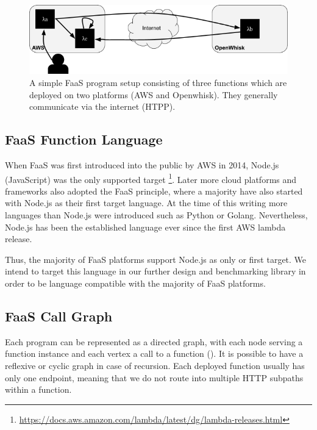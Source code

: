 \documentclass[../main.tex]{subfiles}
\begin{document}
\begin{figure}
\begin{center}
  \includegraphics[width=\linewidth,keepaspectratio]{./3-functions.png}
\end{center}
\caption[Simple FaaS Program Setup]{A simple FaaS program setup consisting of three functions which are deployed on two platforms (AWS and Openwhisk). 
They generally communicate via the internet (HTPP).}%
\label{fig:frameworkSimpleProgramSetup}
\end{figure}

\subsection{FaaS Function Language}%
\label{sub:FaaSLanguage}

When FaaS was first introduced into the public by AWS in 2014, Node.js (JavaScript) was the only supported target%
\footnote{\url{https://docs.aws.amazon.com/lambda/latest/dg/lambda-releases.html}}. 
Later more cloud platforms and frameworks also adopted the FaaS principle, 
where a majority have also started with Node.js as their first target language. 
At the time of this writing more languages than Node.js were introduced such as Python or Golang. 
Nevertheless, Node.js has been the established language ever since the first AWS lambda release.

Thus, the majority of FaaS platforms support Node.js as only or first target. 
We intend to target this language in our further design and benchmarking library 
in order to be language compatible with the majority of FaaS platforms.

\subsection{FaaS Call Graph}%
\label{sub:FaaSCallGraph}

Each program can be represented as a directed graph, 
with each node serving a function instance and each vertex a call to a function (). 
It is possible to have a reflexive or cyclic graph in case of recursion. 
Each deployed function usually has only one endpoint, 
meaning that we do not route into multiple HTTP subpaths within a function.
\end{document}
